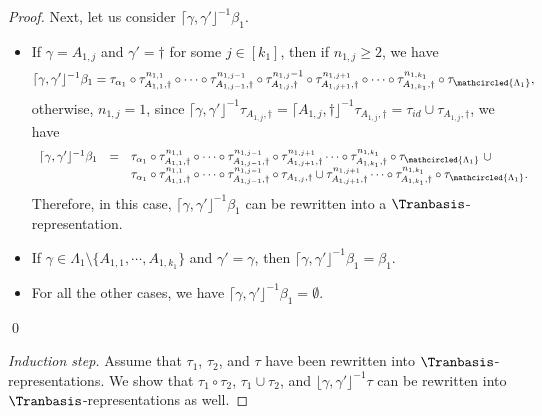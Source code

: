 \begin{proof}
	Next, let us consider $\lceil \gamma, \gamma' \rfloor^{-1} \beta_1$. 
	\begin{itemize}
		\item If $\gamma = A_{1, j}$ and $\gamma' = \dag$ for some $j \in [k_1]$, then if $n_{1,j} \ge 2$, we have
		$$\lceil \gamma, \gamma' \rfloor^{-1} \beta_1 = \tau_{ \alpha_1} \circ \tau^{n_{1,1}}_{A_{1,1}, \dag} \circ \cdots \circ \tau^{n_{1,j-1}}_{A_{1,j-1}, \dag}  \circ \tau^{n_{1,j}-1}_{A_{1,j}, \dag}  \circ  \tau^{n_{1, j+1}}_{A_{1, j+1}, \dag}  \circ \cdots \circ \tau^{n_{1, k_1}}_{A_{1, k_1}, \dag} \circ \tau_{\mathcircled{\Lambda_1}},$$ 
		otherwise, $n_{1,j} = 1$, since $\lceil \gamma, \gamma' \rfloor^{-1} \tau_{A_{1,j}, \dag} = \lceil A_{1, j}, \dag \rfloor^{-1} \tau_{A_{1,j}, \dag} = \tau_{id} \cup \tau_{A_{1,j}, \dag}$,  we have
		$$
		\begin{array}{l c l}
		\lceil \gamma, \gamma' \rfloor^{-1} \beta_1 & = & \tau_{\alpha_1} \circ \tau^{n_{1,1}}_{A_{1,1}, \dag} \circ \cdots \circ \tau^{n_{1,j-1}}_{A_{1,j-1}, \dag}  \circ \tau^{n_{1,j+1}}_{A_{1,j+1}, \dag} \cdots \circ \tau^{n_{1, k_1}}_{A_{1, k_1}, \dag} \circ \tau_{\mathcircled{\Lambda_1}}\ \cup  \\ 
		& & \tau_{\alpha_1} \circ \tau^{n_{1,1}}_{A_{1,1}, \dag} \circ \cdots \circ \tau^{n_{1,j-1}}_{A_{1,j-1}, \dag}  \circ \tau_{A_{1,j}, \dag} \cup \tau^{n_{1,j+1}}_{A_{1,j+1}, \dag} \cdots \circ \tau^{n_{1, k_1}}_{A_{1, k_1}, \dag} \circ \tau_{\mathcircled{\Lambda_1}}.
		\end{array}
		$$
		Therefore, in this case, $\lceil \gamma, \gamma' \rfloor^{-1} \beta_1$ can be rewritten into a $\Tranbasis$-representation.
		\item If $\gamma \in \Lambda_1 \setminus \{A_{1,1}, \cdots, A_{1, k_1}\}$ and $\gamma' = \gamma$, then $\lceil \gamma, \gamma' \rfloor^{-1} \beta_1 = \beta_1$. 
		\item For all the other cases, we have $\lceil \gamma, \gamma' \rfloor^{-1} \beta_1 = \emptyset$.
	\end{itemize}
	\qed
	
	\smallskip
	\noindent\emph{Induction step.} Assume that $\tau_1$, $\tau_2$, and $\tau$ have been rewritten into $\Tranbasis$-representations. We show that $\tau_1 \circ \tau_2$, $\tau_1 \cup \tau_2$, and $\lfloor \gamma, \gamma' \rfloor^{-1} \tau$ can be rewritten into $\Tranbasis$-representations as well.
	

\end{proof}
